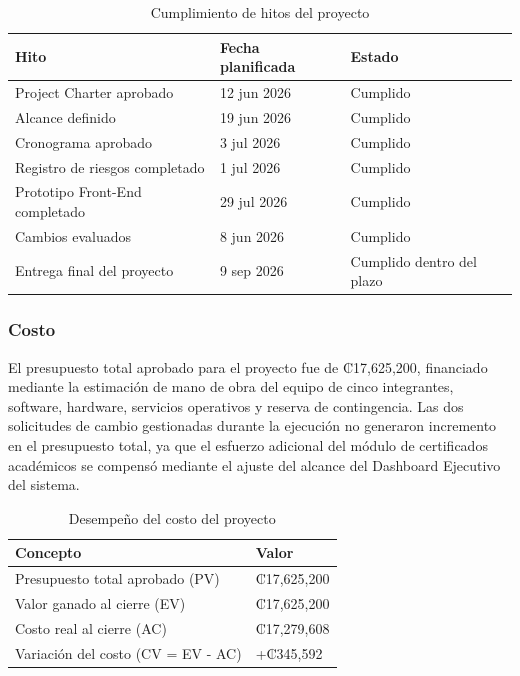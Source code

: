 \documentclass[11pt,spanish]{article}
\begin{document}
\begin{table}[H]
\centering
\caption{Cumplimiento de hitos del proyecto}
\label{tab:hitos}
{\small
\begin{tabularx}{\textwidth}{p{6cm}p{3cm}Y}
\toprule
\textbf{Hito} &
\textbf{Fecha planificada} &
\textbf{Estado} \\
\midrule

Project Charter aprobado &
12 jun 2026 &
Cumplido \\

Alcance definido &
19 jun 2026 &
Cumplido \\

Cronograma aprobado &
3 jul 2026 &
Cumplido \\

Registro de riesgos completado &
1 jul 2026 &
Cumplido \\

Prototipo Front-End completado &
29 jul 2026 &
Cumplido \\

Cambios evaluados &
8 jun 2026 &
Cumplido \\

Entrega final del proyecto &
9 sep 2026 &
Cumplido dentro del plazo \\

\bottomrule
\end{tabularx}
}
\end{table}

\subsubsection{Costo}

El presupuesto total aprobado para el proyecto fue de ₡17,625,200, financiado mediante la estimación de mano de obra del equipo de cinco integrantes, software, hardware, servicios operativos y reserva de contingencia. Las dos solicitudes de cambio gestionadas durante la ejecución no generaron incremento en el presupuesto total, ya que el esfuerzo adicional del módulo de certificados académicos se compensó mediante el ajuste del alcance del Dashboard Ejecutivo del sistema.

\begin{table}[H]
\centering
\caption{Desempeño del costo del proyecto}
\label{tab:costo-proyecto}
\begin{tabularx}{\textwidth}{p{8cm}Y}
\toprule
\textbf{Concepto} & \textbf{Valor} \\
\midrule
Presupuesto total aprobado (PV) & ₡17,625,200 \\
Valor ganado al cierre (EV) & ₡17,625,200 \\
Costo real al cierre (AC) & ₡17,279,608 \\
Variación del costo (CV = EV - AC) & +₡345,592 \\
\bottomrule
\end{tabularx}
\end{table}
\end{document}
